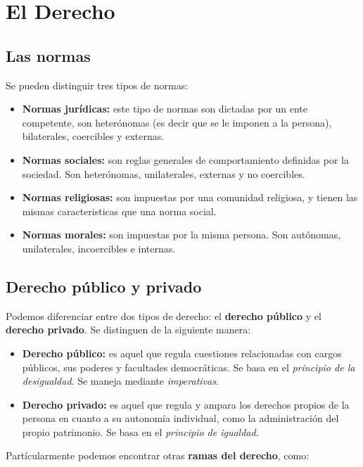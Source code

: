 \documentclass[../main.tex]{subfiles}
\begin{document}
\section{El Derecho}

\subsection{Las normas}

Se pueden distinguir tres tipos de normas:

\begin{itemize}
  \item \textbf{Normas jurídicas:} este tipo de normas son dictadas por un ente
    competente, son heterónomas (es decir que se le imponen a la persona), 
    bilaterales, coercibles y externas.
  \item \textbf{Normas sociales:} son reglas generales de comportamiento definidas
    por la sociedad. Son heterónomas, unilaterales, externas y no coercibles.
  \item \textbf{Normas religiosas:} son impuestas por una comunidad religiosa, y
    tienen las mismas caracteristicas que una norma social.
  \item \textbf{Normas morales:} son impuestas por la misma persona. Son autónomas,
    unilaterales, incoercibles e internas.
\end{itemize}

\subsection{Derecho público y privado}

Podemos diferenciar entre dos tipos de derecho: el \textbf{derecho público} y el
\textbf{derecho privado}. Se distinguen de la siguiente manera:

\begin{itemize}
  \item \textbf{Derecho público:} es aquel que regula cuestiones relacionadas con
    cargos públicos, sus poderes y facultades democráticas. Se basa en el 
    \textit{principio de la desigualdad}. Se maneja mediante \textit{imperativas}.
  \item \textbf{Derecho privado:} es aquel que regula y ampara los derechos propios
    de la persona en cuanto a su autonomía individual, como la administración del
    propio patrimonio. Se basa en el \textit{principio de igualdad.}
\end{itemize}

Partícularmente podemos encontrar otras \textbf{ramas del derecho}, como:
\end{document}
